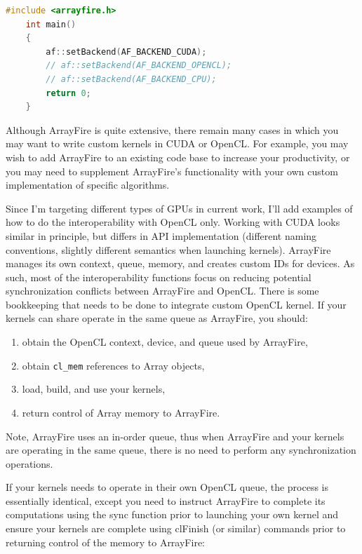 \begin{lstlisting}[language=Cpp, caption=C++ code for setting different computing backends., label=cpp-backends]
	#include <arrayfire.h>
	int main()
	{
		af::setBackend(AF_BACKEND_CUDA);
		// af::setBackend(AF_BACKEND_OPENCL);
		// af::setBackend(AF_BACKEND_CPU);
		return 0;
	}
\end{lstlisting}

Although ArrayFire is quite extensive, there remain many cases in which you may want to write custom kernels in CUDA or OpenCL. For example, you may wish to add ArrayFire to an existing code base to increase your productivity, or you may need to supplement ArrayFire's functionality with your own custom implementation of specific algorithms.

Since I'm targeting different types of GPUs in current work, I'll add examples of how to do the interoperability with OpenCL only. Working with CUDA looks similar in principle, but differs in API implementation (different naming conventions, slightly different semantics when launching kernels).
ArrayFire manages its own context, queue, memory, and creates custom IDs for devices. As such, most of the interoperability functions focus on reducing potential synchronization conflicts between ArrayFire and OpenCL. There is some bookkeeping that needs to be done to integrate custom OpenCL kernel. If your kernels can share operate in the same queue as ArrayFire, you should:

\begin{enumerate}
\item obtain the OpenCL context, device, and queue used by ArrayFire,
\item obtain \texttt{cl_mem} references to Array objects,
\item load, build, and use your kernels,
\item return control of Array memory to ArrayFire.
\end{enumerate}

Note, ArrayFire uses an in-order queue, thus when ArrayFire and your kernels are operating in the same queue, there is no need to perform any synchronization operations.

If your kernels needs to operate in their own OpenCL queue, the process is essentially identical, except you need to instruct ArrayFire to complete its computations using the sync function prior to launching your own kernel and ensure your kernels are complete using clFinish (or similar) commands prior to returning control of the memory to ArrayFire:

